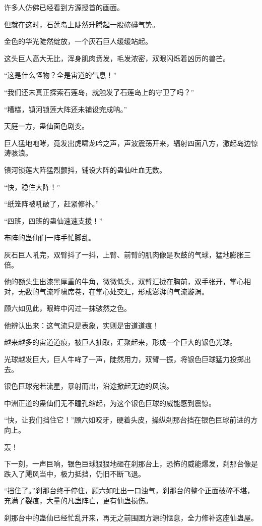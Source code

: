 \begin{this_body}
许多人仿佛已经看到方源授首的画面。

但就在这时，石莲岛上陡然升腾起一股磅礴气势。

金色的华光陡然绽放，一个灰石巨人缓缓站起。

这头巨人高大无比，浑身肌肉贲发，毛发浓密，双眼闪烁着凶厉的兽芒。

“这是什么怪物？全是宙道的气息！”

“我们还未真正探索石莲岛，就触发了石莲岛上的守卫了吗？”

“糟糕，镇河锁莲大阵还未铺设完成呐。”

天庭一方，蛊仙面色剧变。

巨人猛地咆哮，竟发出虎啸龙吟之声，声波震荡开来，辐射四面八方，激起岛边惊涛骇浪。

镇河锁莲大阵猛烈颤抖，铺设大阵的蛊仙吐血无数。

“快，稳住大阵！”

“纸笼阵被吼破了，赶紧修补。”

“四班，四班的蛊仙速速支援！”

布阵的蛊仙们一阵手忙脚乱。

灰石巨人吼完，双臂抖了一抖，上臂、前臂的肌肉像是吹鼓的气球，猛地膨胀三倍。

他的额头生出漆黑厚重的牛角，微微低头，双臂汇拢在胸前，双手张开，掌心相对，无数的气流呼啸席卷，在掌心处交汇，形成澎湃的气流漩涡。

顾六如见此，眼眸中闪过一抹骇然之色。

他辨认出来：这气流只是表象，实则是宙道道痕！

越来越多的宙道道痕，被巨人抽取，汇聚起来，形成一个巨大的银色光球。

光球越发巨大，巨人牛哞了一声，陡然用力，双臂一振，将银色巨球猛力投掷出去。

银色巨球宛若流星，暴射而出，沿途掀起无边的风浪。

中洲正道的蛊仙们无不瞳孔缩起，为这个银色巨球的威能感到震惊。

“快，让我们挡住它！”顾六如咬牙，硬着头皮，操纵刹那台挡在银色巨球前进的方向上。

轰！

下一刻，一声巨响，银色巨球狠狠地砸在刹那台上，恐怖的威能爆发，刹那台像是跌入了飓风当中，极力抵挡，仍旧不断飞退。

“挡住了。”刹那台终于停住，顾六如吐出一口浊气，刹那台的整个正面破碎不堪，充满了裂痕，大量的凡蛊阵亡，更有仙蛊损伤。

刹那台中的蛊仙已经忙乱开来，再无之前围困方源的惬意，全力修补这座仙蛊屋。


\end{this_body}

